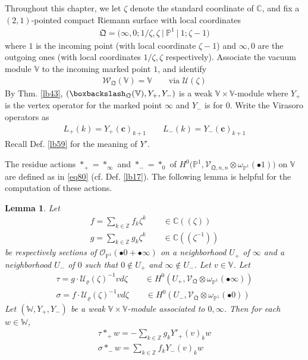 \documentclass[11pt,b5paper,notitlepage]{article}
\theoremstyle{definition}
\theoremstyle{plain}
\newtheorem{lm}[df]{Lemma}
\newcommand{\mc}{\mathcal}
\newcommand{\SV}{\mathscr{V}}
\newcommand{\scr}{\mathscr}
\newcommand{\blt}{\bullet}
\newcommand{\Vbb}{\mathbb V}
\newcommand{\Wbb}{\mathbb W}
\newcommand{\Cbb}{\mathbb C}
\newcommand{\Zbb}{\mathbb Z}
\newcommand{\Pbb}{\mathbb P}
\newcommand{\cbf}{\mathbf c}
\newcommand{\<}{\left\langle}
\renewcommand{\>}{\right\rangle}
\newcommand{\bbs}{\boxbackslash}
\newcommand{\fq}{{\mathfrak Q}}
\numberwithin{equation}{subsection}
\begin{document}
Throughout this chapter, we let $\zeta$ denote the standard coordinate of $\Cbb$, and fix  a $(2,1)$-pointed compact Riemann surface with local coordinates
\begin{align}
\fq=\big(\infty,0;1/\zeta,\zeta~\big|~\Pbb^1~\big|~1;\zeta-1\big)
\end{align}
where $1$ is the incoming point (with local coordinate $\zeta-1$) and $\infty,0$ are the outgoing ones (with local coordinates $1/\zeta,\zeta$ respectively). Associate the vacuum module $\Vbb$ to the incoming marked point $1$, and identify
\begin{align*}
\scr W_\fq(\Vbb)=\Vbb\qquad\text{via }\mc U(\zeta)
\end{align*} 
By Thm. \ref{lb43}, $(\bbs_\fq(\Vbb),Y_+,Y_-)$  is a weak $\Vbb\times\Vbb$-module where $Y_+$  is the vertex operator for the marked point $\infty$ and $Y_-$ is for $0$. Write the Virasoro operators as
\begin{align}
L_+(k)=Y_+(\cbf)_{k+1}\qquad L_-(k)=Y_-(\cbf)_{k+1}
\end{align}
Recall Def. \ref{lb59} for the meaning of $Y'$. 

The residue actions $*_+=*_\infty$ and $*_-=*_0$ of $H^0\big(\Pbb^1, \SV_{\fq,n,n}\otimes \omega_{\Pbb^1}(\bullet 1)\big)$ on $\Vbb$ are defined as in \eqref{eq80} (cf. Def. \ref{lb17}). The following lemma is helpful for the computation of these actions.


\begin{lm}\label{lb73}
Let
\begin{subequations}
\begin{gather}
f=\sum_{k\in\Zbb} f_k\zeta^k\qquad\in\Cbb((\zeta))\\
g=\sum_{k\in\Zbb} g_k\zeta^k\qquad\in\Cbb((\zeta^{-1}))
\end{gather}
\end{subequations}
be respectively sections of $\mc O_{\Pbb^1}(\blt 0+\blt\infty)$ on a neighborhood $U_+$ of $\infty$ and a neighborhood $U_-$ of $0$ such that $0\notin U_+$ and $\infty\notin U_-$. Let $v\in\Vbb$. Let
\begin{gather*}
\tau=g\cdot \mc U_\varrho(\zeta)^{-1}vd\zeta\qquad\in H^0(U_+,\scr V_\fq\otimes\omega_{\Pbb^1}(\blt \infty))\\
\sigma=f\cdot \mc U_\varrho(\zeta)^{-1}vd\zeta\qquad\in H^0(U_-,\scr V_\fq\otimes\omega_{\Pbb^1}(\blt 0))
\end{gather*} 
Let $(\Wbb,Y_+,Y_-)$ be a weak $\Vbb\times\Vbb$-module associated to $0,\infty$. Then for each $w\in\Wbb$,
\begin{subequations}\label{eq145}
\begin{gather}
\tau*_+ w=-\sum_{k\in\Zbb}g_k Y'_+(v)_k w  \label{eq131}\\
\sigma *_- w=\sum_{k\in\Zbb} f_k Y_-(v)_kw  \label{eq130}
\end{gather}
\end{subequations}
\end{lm}
\end{document}
